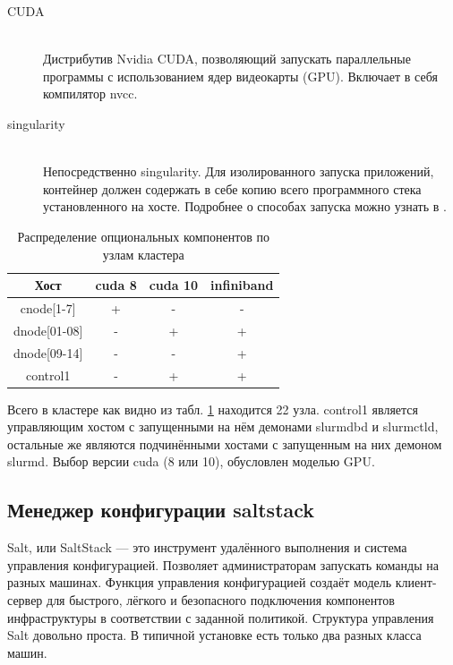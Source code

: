 \documentclass[a4paper]{extarticle}
\begin{document}
\begin{description}
  \item[CUDA] \hfill \\ Дистрибутив Nvidia CUDA, позволяющий запускать параллельные программы с использованием ядер видеокарты (GPU). Включает в себя компилятор nvcc.

  \item[singularity] \hfill \\ Непосредственно singularity. Для изолированного запуска приложений, контейнер должен содержать в себе копию всего программного стека установленного на хосте. Подробнее о способах запуска можно узнать в \cite{mpisingularity}.
\end{description}

\begin{table}[h!]
\centering
\captionsetup[table]{position=below,justification=raggedright}
\caption{Распределение опциональных компонентов по узлам кластера}
\begin{tabular}{|c|ccc|}
\hline
Хост & cuda 8 & cuda 10 & infiniband \\
\hline
cnode[1-7]      &  +          & -             & - \\
dnode[01-08]  &  -           &  +           & + \\
dnode[09-14]  &  -           & -             & + \\ 
control1          & -            & +            & + \\ 
\hline
\end{tabular}
\label{tab:clus}
\end{table}

Всего в кластере как видно из табл. \ref{tab:clus} находится 22 узла. control1 является управляющим хостом с запущенными на нём демонами slurmdbd и slurmctld, остальные же являются подчинёнными хостами с запущенным на них демоном slurmd. Выбор версии cuda (8 или 10), обусловлен моделью GPU.

\subsection{Менеджер конфигурации saltstack}

Salt, или SaltStack --- это инструмент удалённого выполнения и система управления конфигурацией. Позволяет администраторам запускать команды на разных машинах. Функция управления конфигурацией создаёт модель клиент-сервер для быстрого, лёгкого и безопасного подключения компонентов инфраструктуры в соответствии с заданной политикой. Структура управления Salt довольно проста. В типичной установке есть только два разных класса машин.
\end{document}
